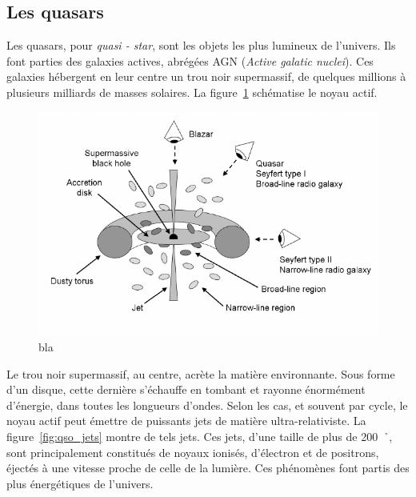 \documentclass[11pt, twoside, a4paper, openright]{report}
\begin{document}
\subsection{Les quasars}
Les quasars, pour \emph{quasi - star}, sont les objets les plus lumineux de l'univers. Ils font parties des galaxies actives, abrégées AGN (\emph{Active galatic nuclei}). Ces galaxies hébergent en leur centre un trou noir supermassif, de quelques millions à plusieurs milliards de masses solaires. La figure~\ref{fig:schema_qso} schématise le noyau actif. 
\begin{figure}[h]
  \centering
  \includegraphics[scale=0.5]{schema_qso.png}
  \caption{bla}
  \label{fig:schema_qso}
\end{figure}
Le trou noir supermassif, au centre, acrète la matière environnante. Sous forme d'un disque, cette dernière s'échauffe en tombant et rayonne énormément d'énergie, dans toutes les longueurs d'ondes. Selon les cas, et souvent par cycle, le noyau actif peut émettre de puissants jets de matière ultra-relativiste. La figure~\ref{fig:qso_jets} montre de tels jets. Ces jets, d'une taille de plus de \SI{200}{\per\h\kpc}, sont principalement constitués de noyaux ionisés, d'électron et de positrons, éjectés à une vitesse proche de celle de la lumière. Ces phénomènes font partis des plus énergétiques de l'univers.
\end{document}
